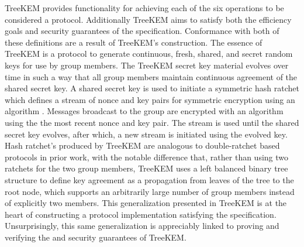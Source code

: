 TreeKEM provides functionality for achieving each of the six operations to be considered a  protocol.
Additionally TreeKEM aims to satisfy both the efficiency goals and security guarantees of the  specification.
Conformance with both of these definitions are a result of TreeKEM's construction.
The essence of TreeKEM is a protocol to generate continuous, fresh, shared, and secret random keys for use by group members.
The TreeKEM secret key material evolves over time in such a way that all group members maintain continuous agreement of the shared secret key.
A shared secret key is used to initiate a symmetric hash ratchet which defines a stream of nonce and key pairs for symmetric encryption using an  algorithm \autocite{bellare2003conventional, kohno2003cwc}.
Messages broadcast to the group are encrypted with an  algorithm using the the most recent nonce and key pair.
The stream is used until the shared secret key evolves, after which, a new stream is initiated using the evolved key.
Hash ratchet's produced by TreeKEM are analogous to double-ratchet based protocols in prior work, with the notable difference that, rather than using two ratchets for the two group members, TreeKEM uses a left balanced binary tree structure to define key agreement as a propagation from leaves of the tree to the root node, which supports an arbitrarily large number of group members instead of explicitly two members.
This generalization presented in TreeKEM is at the heart of constructing a protocol implementation satisfying the  specification.
Unsurprisingly, this same generalization is appreciably linked to proving and verifying the  and  security guarantees of TreeKEM.\@

